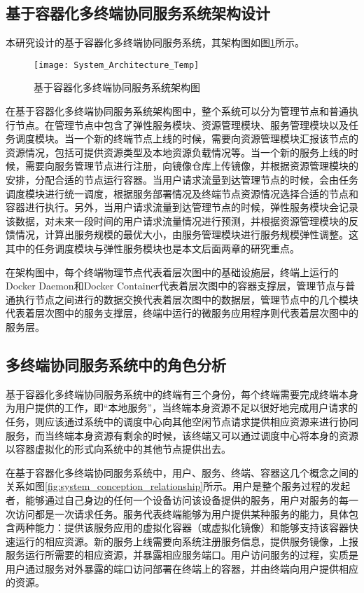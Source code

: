\subsection{基于容器化多终端协同服务系统架构设计}
本研究设计的基于容器化多终端协同服务系统，其架构图如图\ref{fig:system_architecture}所示。
\begin{figure}[!htbp]
    \centering
    \texttt{[image: System\_Architecture\_Temp]}
    \caption{基于容器化多终端协同服务系统架构图}
    \label{fig:system_architecture}
\end{figure}

在基于容器化多终端协同服务系统架构图中，整个系统可以分为管理节点和普通执行节点。在管理节点中包含了弹性服务模块、资源管理模块、服务管理模块以及任务调度模块。当一个新的终端节点上线的时候，需要向资源管理模块汇报该节点的资源情况，包括可提供资源类型及本地资源负载情况等。当一个新的服务上线的时候，需要向服务管理节点进行注册，向镜像仓库上传镜像，并根据资源管理模块的安排，分配合适的节点运行容器。当用户请求流量到达管理节点的时候，会由任务调度模块进行统一调度，根据服务部署情况及终端节点资源情况选择合适的节点和容器进行执行。另外，当用户请求流量到达管理节点的时候，弹性服务模块会记录该数据，对未来一段时间的用户请求流量情况进行预测，并根据资源管理模块的反馈情况，计算出服务规模的最优大小，由服务管理模块进行服务规模弹性调整。这其中的任务调度模块与弹性服务模块也是本文后面两章的研究重点。

在架构图中，每个终端物理节点代表着层次图中的基础设施层，终端上运行的Docker Daemon和Docker Container代表着层次图中的容器支撑层，管理节点与普通执行节点之间进行的数据交换代表着层次图中的数据层，管理节点中的几个模块代表着层次图中的服务支撑层，终端中运行的微服务应用程序则代表着层次图中的服务层。

\subsection{多终端协同服务系统中的角色分析}

基于容器化多终端协同服务系统中的终端有三个身份，每个终端需要完成终端本身为用户提供的工作，即“本地服务”，当终端本身资源不足以很好地完成用户请求的任务，则应该通过系统中的调度中心向其他空闲节点请求提供相应资源来进行协同服务，而当终端本身资源有剩余的时候，该终端又可以通过调度中心将本身的资源以容器虚拟化的形式向系统中的其他节点提供出去。

在基于容器化多终端协同服务系统中，用户、服务、终端、容器这几个概念之间的关系如图\ref{fig:system_conception_relationship}所示。用户是整个服务过程的发起者，能够通过自己身边的任何一个设备访问该设备提供的服务，用户对服务的每一次访问都是一次请求任务。服务代表终端能够为用户提供某种服务的能力，具体包含两种能力：提供该服务应用的虚拟化容器（或虚拟化镜像）和能够支持该容器快速运行的相应资源。新的服务上线需要向系统注册服务信息，提供服务镜像，上报服务运行所需要的相应资源，并暴露相应服务端口。用户访问服务的过程，实质是用户通过服务对外暴露的端口访问部署在终端上的容器，并由终端向用户提供相应的资源。

